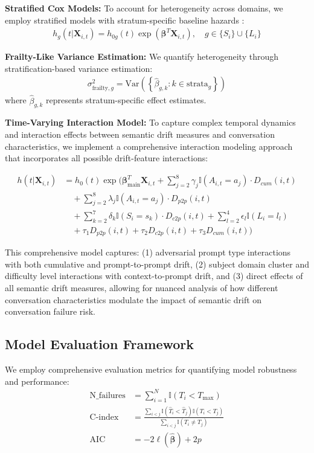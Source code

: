 \documentclass[letterpaper]{article}
\begin{document}
\textbf{Stratified Cox Models:} To account for heterogeneity across domains, we employ stratified models with stratum-specific baseline hazards \cite{klein2003survival}:
\begin{align}
h_g(t|\mathbf{X}_{i,t}) = h_{0g}(t) \exp\left(\boldsymbol{\beta}^T \mathbf{X}_{i,t}\right), \quad g \in \{S_i\} \cup \{L_i\} \label{eq:stratified}
\end{align}

\textbf{Frailty-Like Variance Estimation:} We quantify heterogeneity through stratification-based variance estimation:
\begin{align}
\sigma^2_{\text{frailty},g} = \text{Var}\left(\left\{\hat{\beta}_{g,k} : k \in \text{strata}_g\right\}\right) \label{eq:frailty_var}
\end{align}
where $\hat{\beta}_{g,k}$ represents stratum-specific effect estimates.

\textbf{Time-Varying Interaction Model:} To capture complex temporal dynamics and interaction effects between semantic drift measures and conversation characteristics, we implement a comprehensive interaction modeling approach that incorporates all possible drift-feature interactions:

{\footnotesize
\begin{align}
h(t|\mathbf{X}_{i,t}) &= h_0(t) \exp\Big(\boldsymbol{\beta}_{\text{main}}^T \mathbf{X}_{i,t} + \sum_{j=2}^{8} \gamma_j \mathbb{I}(A_{i,t} = a_j) \cdot D_{cum}(i,t) \nonumber \\
&\quad + \sum_{j=2}^{8} \lambda_j \mathbb{I}(A_{i,t} = a_j) \cdot D_{p2p}(i,t) \nonumber \\
&\quad + \sum_{k=2}^{7} \delta_k \mathbb{I}(S_i = s_k) \cdot D_{c2p}(i,t) + \sum_{l=2}^{4} \epsilon_l \mathbb{I}(L_i = l_l) \nonumber \\
&\quad + \tau_1 D_{p2p}(i,t) + \tau_2 D_{c2p}(i,t) + \tau_3 D_{cum}(i,t)\Big) \label{eq:model3}
\end{align}
}

This comprehensive model captures: (1) adversarial prompt type interactions with both cumulative and prompt-to-prompt drift, (2) subject domain cluster and difficulty level interactions with context-to-prompt drift, and (3) direct effects of all semantic drift measures, allowing for nuanced analysis of how different conversation characteristics modulate the impact of semantic drift on conversation failure risk.

\subsection{Model Evaluation Framework}
We employ comprehensive evaluation metrics for quantifying model robustness and performance:
\begin{align}
\text{N\_failures} &= \sum_{i=1}^{N} \mathbb{I}(T_i < T_{\max}) \label{eq:failures}\\
\text{C-index} &= \frac{\sum_{i<j} \mathbb{I}(\hat{T}_i < \hat{T}_j) \mathbb{I}(T_i < T_j)}{\sum_{i<j} \mathbb{I}(T_i \neq T_j)} \label{eq:cindex}\\
\text{AIC} &= -2\ell(\hat{\boldsymbol{\beta}}) + 2p \label{eq:aic}
\end{align}
\end{document}
